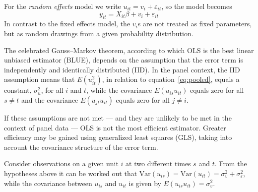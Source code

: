 For the \textsl{random effects} model we write $u_{it} = v_i +
\varepsilon_{it}$, so the model becomes
\begin{equation}
\label{eq:RE}
y_{it} = X_{it}\beta + v_i + \varepsilon_{it}
\end{equation}
In contrast to the fixed effects model, the $v_i$s are not treated as
fixed parameters, but as random drawings from a given probability
distribution.

The celebrated Gauss--Markov theorem, according to which OLS is the
best linear unbiased estimator (BLUE), depends on the assumption that
the error term is independently and identically distributed (IID).  In
the panel context, the IID assumption means that $E(u_{it}^2)$, in
relation to equation~\ref{eq:pooled}, equals a constant, $\sigma^2_u$,
for all $i$ and $t$, while the covariance $E(u_{is} u_{it})$ equals
zero for all $s \neq t$ and the covariance $E(u_{jt} u_{it})$ equals
zero for all $j \neq i$.

If these assumptions are not met --- and they are unlikely to be met
in the context of panel data --- OLS is not the most efficient
estimator.  Greater efficiency may be gained using generalized least
squares (GLS), taking into account the covariance structure of the
error term.  

Consider observations on a given unit $i$ at two different times
$s$ and $t$. From the hypotheses above it can be worked out that
$\mbox{Var}(u_{is}) = \mbox{Var}(u_{it}) = \sigma^2_{v} +
\sigma^2_{\varepsilon}$, while the covariance between $u_{is}$ and
$u_{it}$ is given by $E(u_{is}u_{it}) = \sigma^2_{v}$.

